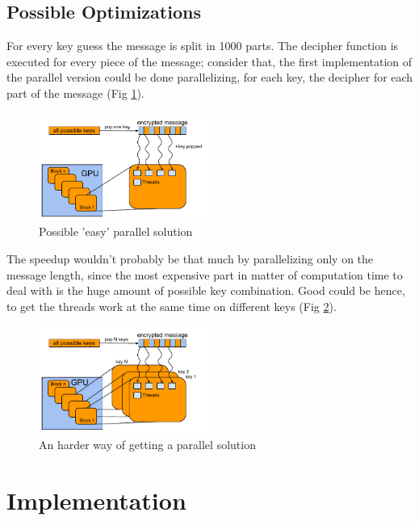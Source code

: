 \documentclass[11pt,conference]{IEEEtran}
\begin{document}
\subsection{Possible Optimizations}
For every key guess the message is split in 1000 parts. The decipher function is executed for every piece of the message; consider that, the first implementation of the parallel version could be done parallelizing, for each key, the decipher for each part of the message (Fig \ref{fig:parallel_sol_1}).
\begin{figure}[h!]
  \centering
    \includegraphics[width=0.5\textwidth]{parallel_sol_1}
    \caption{Possible 'easy' parallel solution}
    \label{fig:parallel_sol_1}
\end{figure}

The speedup wouldn't probably be that much by parallelizing only on the message length, since the most expensive part in matter of computation time to deal with is the huge amount of possible key combination. Good could be hence, to get the threads work at the same time on different keys (Fig \ref{fig:parallel_sol_2}).
\begin{figure}[h!]
  \centering
    \includegraphics[width=0.5\textwidth]{parallel_sol_2}
    \caption{An harder way of getting a parallel solution}
    \label{fig:parallel_sol_2}
\end{figure}


\section{Implementation}
\end{document}
